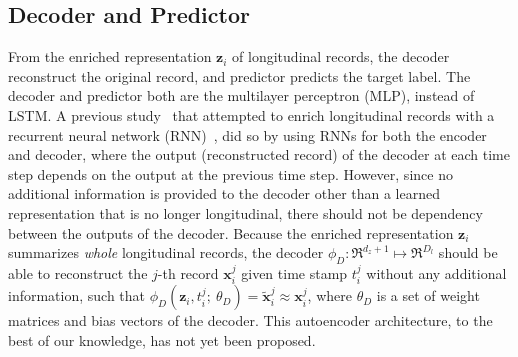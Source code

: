
\subsection{Decoder and Predictor}
From the enriched representation $\mathbf{z}_i$ of longitudinal records, the decoder reconstruct the original record, and predictor predicts the target label.
The decoder and predictor both are the multilayer perceptron (MLP), instead of LSTM. A previous study~\cite{srivastava2015unsupervised} that attempted to enrich longitudinal records with a recurrent neural network (RNN)~\cite{medsker2001recurrent}, did so by using RNNs for both the encoder and decoder, where the output (reconstructed record) of the decoder at each time step depends on the output at the previous time step. However, since no additional information is provided to the decoder other than a learned representation that is no longer longitudinal, there should not be dependency between the outputs of the decoder. Because the enriched representation $\mathbf{z}_i$ summarizes \emph{whole} longitudinal records, the decoder $\phi_D:\Re^{d_z + 1} \mapsto \Re^{D_l}$ should be able to reconstruct the $j$-th record $\mathbf{x}_i^j$ given time stamp $t_i^j$ without any additional information, such that $\phi_D(\mathbf{z}_i, t^j_i;\ \theta_D) = \tilde{\mathbf{x}}_i^j \approx \mathbf{x}_i^j$, where $\theta_D$ is a set of weight matrices and bias vectors of the decoder. This autoencoder architecture, to the best of our knowledge, has not yet been proposed. 

